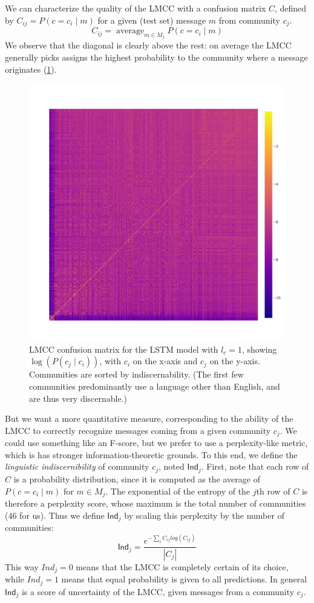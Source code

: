 \documentclass[11pt]{article}
\newcommand\jp[1]{\todo[backgroundcolor=blue!10]{JP: #1}}
\newcommand\Ind{\mathsf{Ind}}
\DeclareMathOperator*{\avg}{average}
\begin{document}
We can characterize the quality\jp{performance} of the LMCC with a confusion matrix
$C$, defined by $C_{ij} = P(c=c_i \mid m)$ for a given (test set) message $m$ 
from community $c_j$.
\[C_{ij} = \avg_{m\in M_j}P(c=c_i \mid m)\]
We observe that the diagonal is clearly above the rest: on average the LMCC generally
picks assigns the highest probability to the community where a message originates (\cref{fig:confusion}).

\begin{figure}
  \includegraphics[width=\linewidth]{floats/confusion_lstm-3-1}
\caption{
  LMCC confusion matrix for the LSTM model with $l_c=1$, showing $\log(P(c_j\mid c_i))$, 
  with $c_i$ on the x-axis and $c_j$ on the y-axis.
  Communities are sorted by indiscernability.
  (The first few communities predominantly use a language other than English, and are thus very discernable.)}
\label{fig:confusion}
\end{figure}


But we want a more quantitative measure, corresponding to the ability of the LMCC to correctly
recognize messages coming from a given community $c_j$. We could use
something like an F-score, but we prefer to use a perplexity-like metric,
which is has stronger information-theoretic grounds.
To this end, we define the \emph{linguistic indiscernibility} of community $c_j$, 
noted $\Ind_j$. 
First, note that each row of $C$ is a probability distribution,
since it is computed as the average of $P(c=c_i \mid m)$ for $m\in M_j$.
The exponential of the entropy of the $j$th row of \(C\) is therefore a perplexity score,
whose maximum is the total number of communities (46 for us).
Thus we define $\Ind_j$ by scaling this perplexity by the number of communities:
\[\Ind_j = \frac{e^{-\sum_i C_{ij} log(C_{ij})}}{|C_j|}\]
This way $Ind_j=0$ means that the LMCC is completely certain of its
choice, while $Ind_j=1$ means that equal probability is given to all
predictions.  In general $\Ind_j$ is a score of uncertainty of the
LMCC, given messages from a community $c_j$.
\end{document}
